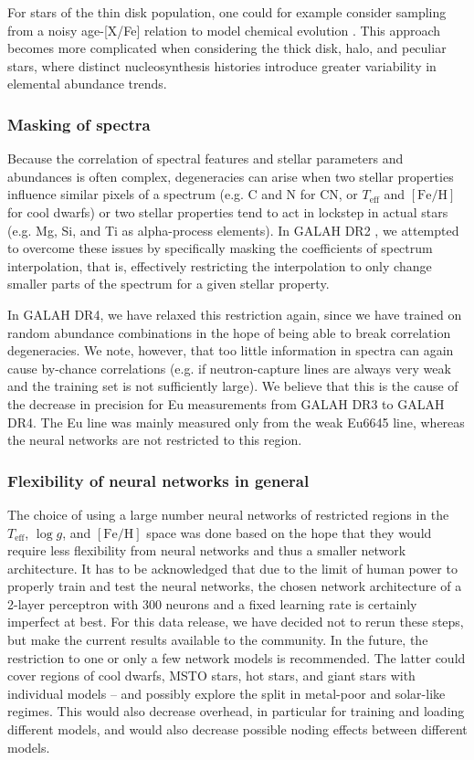 \documentclass[
  journal=pasa,
  manuscript=research-paper, %
  year=2024,
  volume=37
]{cup-journal}
\newcommand{\Teff}{$T_\mathrm{eff}$\xspace}
\newcommand{\logg}{$\log g$\xspace}
\newcommand{\feh}{$\mathrm{[Fe/H]}$\xspace}
\newcommand{\TLF}{\Teff, \logg, and \feh}
\begin{document}
For stars of the thin disk population, one could for example consider sampling from a noisy age-[X/Fe] relation to model chemical evolution \citep[see Fig.~\ref{fig:galah_dr4_age_xfe_trends_solar_twins_allstar}][]{Nissen2015, Spina2016, Bedell2018}. This approach becomes more complicated when considering the thick disk, halo, and peculiar stars, where distinct nucleosynthesis histories introduce greater variability in elemental abundance trends.

\subsubsection{Masking of spectra}

Because the correlation of spectral features and stellar parameters and abundances is often complex, degeneracies can arise when two stellar properties influence similar pixels of a spectrum (e.g. C and N for CN, or \Teff and \feh for cool dwarfs) or two stellar properties tend to act in lockstep in actual stars (e.g. Mg, Si, and Ti as alpha-process elements). In GALAH DR2 \citep{Buder2018}, we attempted to overcome these issues by specifically masking the coefficients of spectrum interpolation, that is, effectively restricting the interpolation to only change smaller parts of the spectrum for a given stellar property.

In GALAH DR4, we have relaxed this restriction again, since we have trained on random abundance combinations in the hope of being able to break correlation degeneracies. We note, however, that too little information in spectra can again cause by-chance correlations (e.g. if neutron-capture lines are always very weak and the training set is not sufficiently large). We believe that this is the cause of the decrease in precision for Eu measurements from GALAH DR3 to GALAH DR4. The Eu line was mainly measured only from the weak Eu6645 line, whereas the neural networks are not restricted to this region.

\subsubsection{Flexibility of neural networks in general}

The choice of using a large number neural networks of restricted regions in the \TLF space was done based on the hope that they would require less flexibility from neural networks and thus a smaller network architecture. It has to be acknowledged that due to the limit of human power to properly train and test the neural networks, the chosen network architecture of a 2-layer perceptron with 300 neurons and a fixed learning rate is certainly imperfect at best. For this data release, we have decided not to rerun these steps, but make the current results available to the community. In the future, the restriction to one or only a few network models is recommended. The latter could cover regions of cool dwarfs, MSTO stars, hot stars, and giant stars with individual models -- and possibly explore the split in metal-poor and solar-like regimes. This would also decrease overhead, in particular for training and loading different models, and would also decrease possible noding effects between different models.
\end{document}
